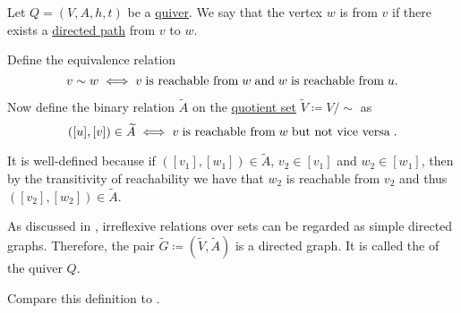 \begin{definition}\label{def:quiver_condensation}
  Let \( Q = (V, A, h, t) \) be a \hyperref[def:quiver]{quiver}. We say that the vertex \( w \) is  from \( v \) if there exists a \hyperref[def:quiver_path/directed]{directed path} from \( v \) to \( w \).

  Define the equivalence relation
  \begin{equation*}
    v \sim w \iff v \T{is reachable from} w \T{and} w \T{is reachable from} u.
  \end{equation*}

  Now define the binary relation \( \widetilde{A} \) on the \hyperref[def:equivalence_relation/quotient]{quotient set} \( \widetilde{V} \coloneqq V / {\sim} \) as
  \begin{equation*}
    ([u], [v]) \in \widetilde{A} \iff v \T{is reachable from} w \T{but not vice versa}.
  \end{equation*}

  It is well-defined because if \( ([v_1], [w_1]) \in \widetilde{A} \), \( v_2 \in [v_1] \) and \( w_2 \in [w_1] \), then by the transitivity of reachability we have that \( w_2 \) is reachable from \( v_2 \) and thus \( ([v_2], [w_2]) \in \widetilde{A} \).

  As discussed in , irreflexive relations over sets can be regarded as simple directed graphs. Therefore, the pair \( \widetilde{G} \coloneqq (\widetilde{V}, \widetilde{A}) \) is a directed graph. It is called the  of the quiver \( Q \).

  Compare this definition to .
\end{definition}

